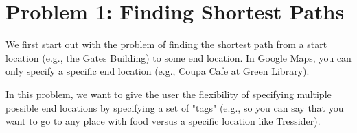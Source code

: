 \documentclass{article}
\theoremstyle{case}
\theoremstyle{definition}
\begin{document}
\newpage

\section*{Problem 1: Finding Shortest Paths}


  We first start out with the problem of finding the shortest path from a start location
  (e.g., the Gates Building) to some end location. In Google Maps, you can only specify a specific end location
  (e.g., Coupa Cafe at Green Library).
  
  In this problem, we want to give the user the flexibility of specifying multiple possible end
  locations by specifying a set of "tags" (e.g., so you can say that you want to go to any place with food versus
  a specific location like Tressider).
\end{document}
